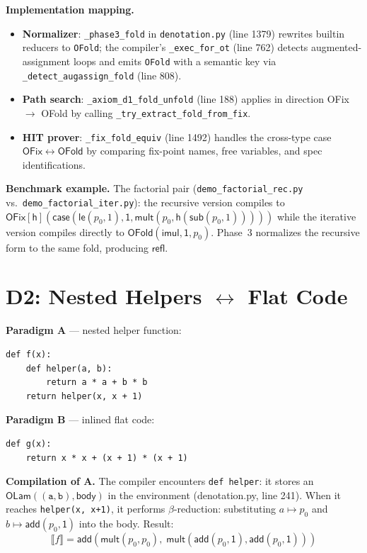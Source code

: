 \documentclass[11pt,a4paper]{report}
\theoremstyle{definition}
\theoremstyle{plain}
\newcommand{\den}[1]{\llbracket #1 \rrbracket}
\begin{document}
\textbf{Implementation mapping.}
\begin{itemize}
  \item \textbf{Normalizer}: \texttt{\_phase3\_fold} in
    \texttt{denotation.py} (line 1379) rewrites builtin reducers to
    \texttt{OFold}; the compiler's \texttt{\_exec\_for\_ot}
    (line 762) detects augmented-assignment loops and emits
    \texttt{OFold} with a semantic key via
    \texttt{\_detect\_augassign\_fold} (line 808).
  \item \textbf{Path search}: \texttt{\_axiom\_d1\_fold\_unfold}
    (line 188) applies in direction OFix $\to$ OFold by calling
    \texttt{\_try\_extract\_fold\_from\_fix}.
  \item \textbf{HIT prover}: \texttt{\_fix\_fold\_equiv}
    (line 1492) handles the cross-type case
    $\mathsf{OFix} \leftrightarrow \mathsf{OFold}$ by comparing
    fix-point names, free variables, and spec identifications.
\end{itemize}

\textbf{Benchmark example.}
The factorial pair (\texttt{demo\_factorial\_rec.py} vs.\
\texttt{demo\_factorial\_iter.py}): the recursive version compiles to
$\mathsf{OFix}[\mathsf{h}](\mathsf{case}(\mathsf{le}(p_0, 1),
\mathsf{1}, \mathsf{mult}(p_0, \mathsf{h}(\mathsf{sub}(p_0,1)))))$
while the iterative version compiles directly to
$\mathsf{OFold}(\mathsf{imul}, \mathsf{1}, p_0)$.
Phase~3 normalizes the recursive form to the same fold,
producing $\mathsf{refl}$.


\section{D2: Nested Helpers $\leftrightarrow$ Flat Code}
\label{sec:d2}

\textbf{Paradigm A} --- nested helper function:
\begin{lstlisting}
def f(x):
    def helper(a, b):
        return a * a + b * b
    return helper(x, x + 1)
\end{lstlisting}

\textbf{Paradigm B} --- inlined flat code:
\begin{lstlisting}
def g(x):
    return x * x + (x + 1) * (x + 1)
\end{lstlisting}

\textbf{Compilation of A.}
The compiler encounters \texttt{def helper}: it stores an
$\mathsf{OLam}((\texttt{a}, \texttt{b}), \mathsf{body})$ in the
environment (denotation.py, line 241).  When it reaches
\texttt{helper(x, x+1)}, it performs $\beta$-reduction:
substituting $a \mapsto p_0$ and
$b \mapsto \mathsf{add}(p_0, \mathsf{1})$
into the body.  Result:
\[
  \den{f} = \mathsf{add}(\mathsf{mult}(p_0, p_0),\;
    \mathsf{mult}(\mathsf{add}(p_0, \mathsf{1}),
                   \mathsf{add}(p_0, \mathsf{1})))
\]
\end{document}
